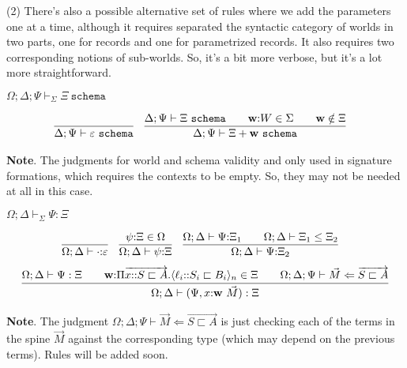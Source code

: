 \documentclass[letterpaper, 11pt]{article}
\newcommand{\Lar}{\Leftarrow}
\newcommand{\schema}{\texttt{schema}}
\begin{document}
    (2) There's also a possible alternative set of rules where we add the parameters one at a time, although it requires separated the syntactic
    category of worlds in two parts, one for records and one for parametrized records.  It also requires two corresponding notions of sub-worlds.
    So, it's a bit more verbose, but it's a lot more straightforward.

    $\boxed{\Omega; \Delta; \Psi \vdash_\Sigma \Xi \ \schema}$

    \begin{align*}
      & \infer{\Delta; \Psi \vdash \varepsilon \ \schema}{} &
      & \infer{\Delta; \Psi \vdash \Xi + \textbf{w} \ \schema}
        {
          \Delta; \Psi \vdash \Xi \ \schema
          &&
          \textbf{w} {:} W \in \Sigma
          &&
          \textbf{w} \notin \Xi
        }
    \end{align*}
    
    \textbf{Note}.  The judgments for world and schema validity and only used in signature formations, which requires the contexts to be empty.
    So, they may not be needed at all in this case.

    $\boxed{\Omega; \Delta \vdash_\Sigma \Psi : \Xi}$
    
    \begin{align*}
      & \infer{\Omega; \Delta \vdash \cdot {:} \varepsilon}{} &
      & \infer{\Omega; \Delta \vdash \psi {:} \Xi}{\psi {:} \Xi \in \Omega} &
      & \infer{\Omega; \Delta \vdash \Psi {:} \Xi_2}
        {
          \Omega; \Delta \vdash \Psi {:} \Xi_1
          &&
          \Omega; \Delta \vdash \Xi_1 \leq \Xi_2
        }
    \end{align*}
    \begin{align*}
      \infer{\Omega; \Delta \vdash (\Psi, x{:} \textbf{w} \ \vec{M}) : \Xi}
            {
              \Omega; \Delta \vdash \Psi : \Xi
              &&
              \textbf{w} {:} \Pi \overrightarrow{x{::}S \sqsubset A}. \langle \ell_i {::} S_i \sqsubset B_i \rangle_n \in \Xi
              &&
              \Omega ; \Delta; \Psi \vdash \vec{M} \Lar \overrightarrow{S \sqsubset A}
            }
    \end{align*}

    \textbf{Note}. The judgment $\Omega; \Delta; \Psi \vdash \vec{M} \Lar \overrightarrow{S \sqsubset A}$ is just checking each of the terms in the 
    spine $\vec{M}$ against the corresponding type (which may depend on the previous terms).  Rules will be added soon.
\end{document}
